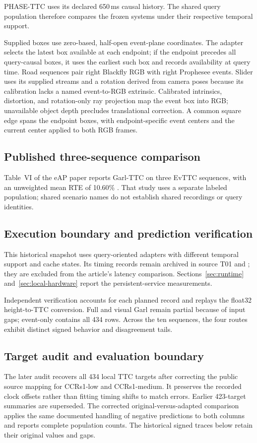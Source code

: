 PHASE-TTC uses its declared 650\,ms causal history. The shared query population therefore compares the frozen systems under their respective temporal support.

Supplied boxes use zero-based, half-open event-plane coordinates. The adapter selects the latest box available at each endpoint; if the endpoint precedes all query-causal boxes, it uses the earliest such box and records availability at query time. Road sequences pair right Blackfly RGB with right Prophesee events. Slider uses its supplied streams and a rotation derived from camera poses because its calibration lacks a named event-to-RGB extrinsic. Calibrated intrinsics, distortion, and rotation-only ray projection map the event box into RGB; unavailable object depth precludes translational correction. A common square edge spans the endpoint boxes, with endpoint-specific event centers and the current center applied to both RGB frames.


\subsection{Published three-sequence comparison}
Table~VI of the eAP paper reports Garl-TTC on three EvTTC sequences, with an unweighted mean RTE of 10.60\% \citep{eap}. That study uses a separate labeled population; shared scenario names do not establish shared recordings or query identities. 



\subsection{Execution boundary and prediction verification}

This historical snapshot uses query-oriented adapters with different temporal support and cache states. Its timing records remain archived in source T01 and ; they are excluded from the article's latency comparison. Sections~\ref{sec:runtime} and~\ref{sec:local-hardware} report the persistent-service measurements.

Independent verification accounts for each planned record and replays the float32 height-to-TTC conversion. Full and visual Garl remain partial because of input gaps; event-only contains all 434 rows. Across the ten sequences, the four routes exhibit distinct signed behavior and disagreement tails. 

\subsection{Target audit and evaluation boundary}
The later audit recovers all 434 local TTC targets after correcting the public source mapping for CCRs1-low and CCRs1-medium. It preserves the recorded clock offsets rather than fitting timing shifts to match errors. Earlier 423-target summaries are superseded. The corrected original-versus-adapted comparison applies the same documented handling of negative predictions to both columns and reports complete population counts. The historical signed traces below retain their original values and gaps. 

